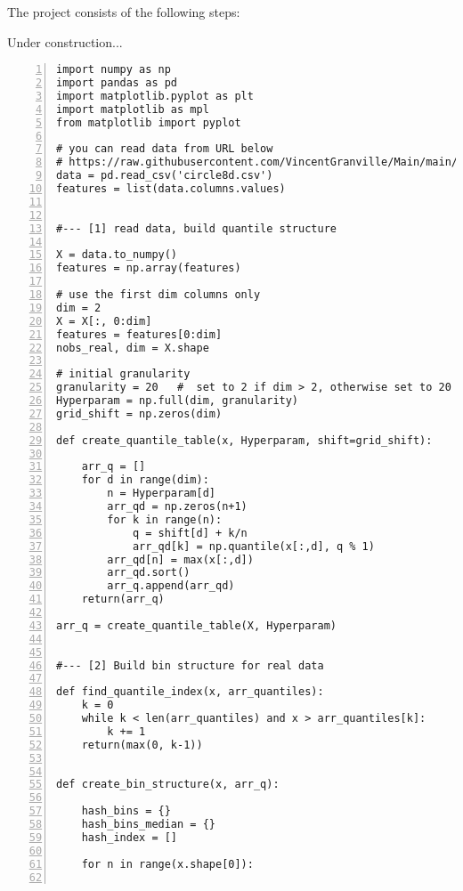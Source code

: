 \documentclass[oneside,10pt]{book}
\begin{document}
\noindent The project consists of the following steps:

Under construction...



\begin{lstlisting}[numbers=left]
import numpy as np
import pandas as pd
import matplotlib.pyplot as plt
import matplotlib as mpl
from matplotlib import pyplot

# you can read data from URL below
# https://raw.githubusercontent.com/VincentGranville/Main/main/circle8d.csv
data = pd.read_csv('circle8d.csv')
features = list(data.columns.values)


#--- [1] read data, build quantile structure 

X = data.to_numpy()
features = np.array(features)

# use the first dim columns only
dim = 2 
X = X[:, 0:dim] 
features = features[0:dim]
nobs_real, dim = X.shape

# initial granularity
granularity = 20   #  set to 2 if dim > 2, otherwise set to 20
Hyperparam = np.full(dim, granularity) 
grid_shift = np.zeros(dim)

def create_quantile_table(x, Hyperparam, shift=grid_shift):

    arr_q = [] 
    for d in range(dim): 
        n = Hyperparam[d]
        arr_qd = np.zeros(n+1)
        for k in range(n):
            q = shift[d] + k/n
            arr_qd[k] = np.quantile(x[:,d], q % 1)
        arr_qd[n] = max(x[:,d])
        arr_qd.sort()
        arr_q.append(arr_qd)
    return(arr_q)

arr_q = create_quantile_table(X, Hyperparam)


#--- [2] Build bin structure for real data

def find_quantile_index(x, arr_quantiles):
    k = 0
    while k < len(arr_quantiles) and x > arr_quantiles[k]: 
        k += 1
    return(max(0, k-1)) 


def create_bin_structure(x, arr_q):

    hash_bins = {}
    hash_bins_median = {}
    hash_index = []

    for n in range(x.shape[0]):


\end{lstlisting}
\end{document}
